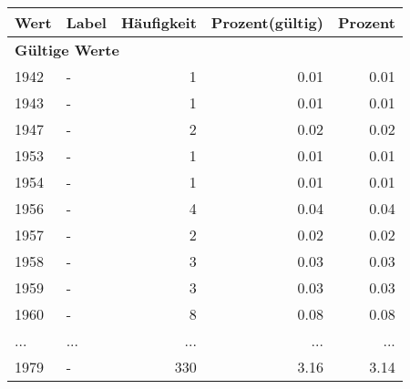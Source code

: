      \begin{longtable}{lXrrr}
     \toprule
     \textbf{Wert} & \textbf{Label} & \textbf{Häufigkeit} & \textbf{Prozent(gültig)} & \textbf{Prozent} \\
     \endhead
     \midrule
     \multicolumn{5}{l}{\textbf{Gültige Werte}}\\
        1942 & \multicolumn{1}{X}{-} & %
          \num{1} &
          \num[round-mode=places,round-precision=2]{0,01} &
          \num[round-mode=places,round-precision=2]{0,01} \\
        1943 & \multicolumn{1}{X}{-} & %
          \num{1} &
          \num[round-mode=places,round-precision=2]{0,01} &
          \num[round-mode=places,round-precision=2]{0,01} \\
        1947 & \multicolumn{1}{X}{-} & %
          \num{2} &
          \num[round-mode=places,round-precision=2]{0,02} &
          \num[round-mode=places,round-precision=2]{0,02} \\
        1953 & \multicolumn{1}{X}{-} & %
          \num{1} &
          \num[round-mode=places,round-precision=2]{0,01} &
          \num[round-mode=places,round-precision=2]{0,01} \\
        1954 & \multicolumn{1}{X}{-} & %
          \num{1} &
          \num[round-mode=places,round-precision=2]{0,01} &
          \num[round-mode=places,round-precision=2]{0,01} \\
        1956 & \multicolumn{1}{X}{-} & %
          \num{4} &
          \num[round-mode=places,round-precision=2]{0,04} &
          \num[round-mode=places,round-precision=2]{0,04} \\
        1957 & \multicolumn{1}{X}{-} & %
          \num{2} &
          \num[round-mode=places,round-precision=2]{0,02} &
          \num[round-mode=places,round-precision=2]{0,02} \\
        1958 & \multicolumn{1}{X}{-} & %
          \num{3} &
          \num[round-mode=places,round-precision=2]{0,03} &
          \num[round-mode=places,round-precision=2]{0,03} \\
        1959 & \multicolumn{1}{X}{-} & %
          \num{3} &
          \num[round-mode=places,round-precision=2]{0,03} &
          \num[round-mode=places,round-precision=2]{0,03} \\
        1960 & \multicolumn{1}{X}{-} & %
          \num{8} &
          \num[round-mode=places,round-precision=2]{0,08} &
          \num[round-mode=places,round-precision=2]{0,08} \\
       ... & ... & ... & ... & ... \\
        1979 & \multicolumn{1}{X}{-} & %
          \num{330} &
          \num[round-mode=places,round-precision=2]{3,16} &
          \num[round-mode=places,round-precision=2]{3,14} \\


\end{longtable}
